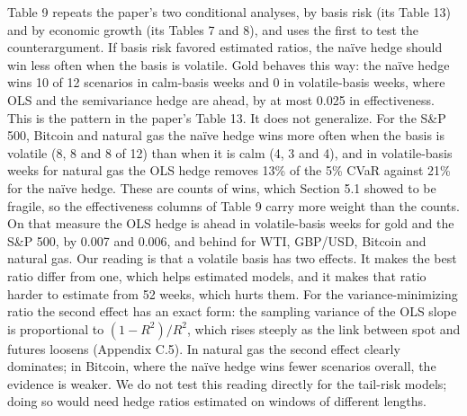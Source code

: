 \documentclass[11pt,letterpaper]{article}
\begin{document}
Table 9 repeats the paper's two conditional analyses, by basis risk (its Table 13) and by economic growth (its Tables 7 and 8), and uses the first to test the counterargument. If basis risk favored estimated ratios, the naïve hedge should win less often when the basis is volatile. Gold behaves this way: the naïve hedge wins 10 of 12 scenarios in calm-basis weeks and 0 in volatile-basis weeks, where OLS and the semivariance hedge are ahead, by at most 0.025 in effectiveness. This is the pattern in the paper's Table 13. It does not generalize. For the S\&P 500, Bitcoin and natural gas the naïve hedge wins more often when the basis is volatile (8, 8 and 8 of 12) than when it is calm (4, 3 and 4), and in volatile-basis weeks for natural gas the OLS hedge removes 13\% of the 5\% CVaR against 21\% for the naïve hedge. These are counts of wins, which Section 5.1 showed to be fragile, so the effectiveness columns of Table 9 carry more weight than the counts. On that measure the OLS hedge is ahead in volatile-basis weeks for gold and the S\&P 500, by 0.007 and 0.006, and behind for WTI, GBP/USD, Bitcoin and natural gas. Our reading is that a volatile basis has two effects. It makes the best ratio differ from one, which helps estimated models, and it makes that ratio harder to estimate from 52 weeks, which hurts them. For the variance-minimizing ratio the second effect has an exact form: the sampling variance of the OLS slope is proportional to $(1-R^2)/R^2$, which rises steeply as the link between spot and futures loosens (Appendix C.5). In natural gas the second effect clearly dominates; in Bitcoin, where the naïve hedge wins fewer scenarios overall, the evidence is weaker. We do not test this reading directly for the tail-risk models; doing so would need hedge ratios estimated on windows of different lengths.
\end{document}
